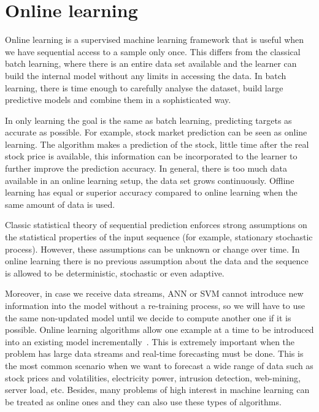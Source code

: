 
\section{Online learning} \label{sec:onoffline}

Online learning is a supervised machine learning framework that is useful when we have sequential access to a sample only once.  This differs from the classical batch learning, where there is an entire data set available and the learner can build the internal model without any limits in accessing the data. In batch learning, there is time enough to carefully analyse the dataset, build large predictive models and combine them in a sophisticated way. 

In only learning the goal is the same as batch learning, predicting targets as accurate as possible. For example, stock market prediction can be seen as online learning. The algorithm makes a prediction of the stock, little time after the real stock price is available, this information can be incorporated to the learner to further improve the prediction accuracy. In general, there is too much data available in an online learning setup, the data set grows continuously. Offline learning has equal or superior accuracy compared to online learning when the same amount of data is used.

Classic statistical theory of sequential prediction enforces strong assumptions on the statistical properties of the input sequence (for example, stationary stochastic process). However, these assumptions can be unknown or change over time. In online learning there is no previous assumption about the data and the sequence is allowed to be deterministic, stochastic or even adaptive.  

Moreover, in case we receive data streams, ANN or SVM cannot introduce new information into the model without a re-training process, so we will have to use the same non-updated model until we decide to compute another one if it is possible.  Online learning algorithms allow one example at a time to be introduced into an existing model incrementally~\cite{vovk2005}. This is extremely important when the problem has large data streams and real-time forecasting must be done.  This is the most common scenario when we want to forecast a wide range of data such as stock prices and volatilities, electricity power, intrusion detection, web-mining, server load, etc.  Besides, many problems of high interest in machine learning can be treated as online ones and they can also use these types of algorithms.

